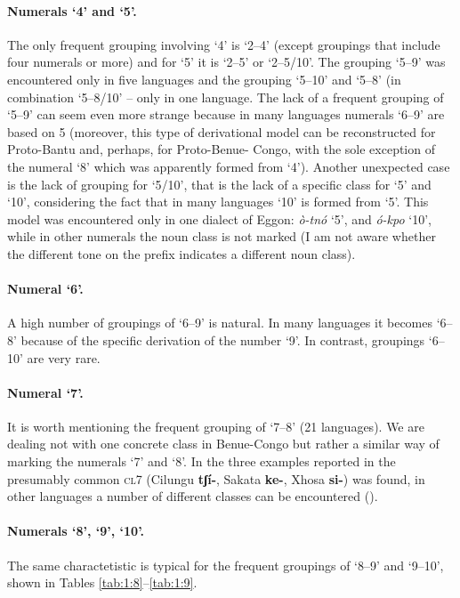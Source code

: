 \paragraph*{Numerals ‘4’ and ‘5’.} The only frequent grouping involving ‘4’ is ‘2--4’ (except groupings that include four numerals or more) and for ‘5’ it is ‘2--5’ or ‘2--5/10’. The grouping ‘5--9’ was encountered only in five languages and the grouping ‘5--10’ and ‘5--8’ (in combination ‘5--8/10’ – only in one language. The lack of a frequent grouping of ‘5--9’ can seem even more strange because in many languages numerals ‘6--9’ are based on 5 (moreover, this type of derivational model can be reconstructed for Proto-Bantu and, perhaps, for Proto-Benue- Congo, with the sole exception of the numeral ‘8’ which was apparently formed from ‘4’). Another unexpected case is the lack of grouping for ‘5/10’, that is the lack of a specific class for ‘5’ and ‘10’, considering the fact that in many languages ‘10’ is formed from ‘5’. This model was encountered only in one dialect of Eggon: \textit{ò-tnó} ‘5’, and \textit{ó-kpo} ‘10’, while in other numerals the noun class is not marked (I am not aware whether the different tone on the prefix indicates a different noun class). 

\paragraph*{Numeral ‘6’.} A high number of groupings of ‘6--9’ is natural. In many languages it becomes ‘6--8’ because of the specific derivation of the number ‘9’. In contrast, groupings ‘6--10’ are very rare. 

\paragraph*{Numeral ‘7’.} It is worth mentioning the frequent grouping of ‘7--8’ (21 languages). We are dealing not with one concrete class in Benue-Congo but rather a similar way of marking the numerals ‘7’ and ‘8’. In the three examples reported in  the presumably common \textsc{cl}7 (Cilungu \textbf{tʃí-}, Sakata \textbf{ke-}, Xhosa \textbf{si-}) was found, in other languages a number of different classes can be encountered (). 

\paragraph*{Numerals ‘8’, ‘9’, ‘10’.} The same charactetistic is typical for the frequent groupings of ‘8--9’ and ‘9--10’, shown in Tables \ref{tab:1:8}--\ref{tab:1:9}. 


